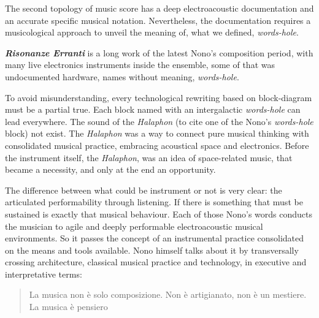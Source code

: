 \documentclass[
	a0,
	portrait
	]{a0poster}
\begin{document}
\begin{multicols}{4}
The second topology of music score has a deep electroacoustic documentation and an accurate specific musical notation. Nevertheless, the documentation requires a musicological approach to unveil the meaning of, what we defined, \emph{words-hole}.

\emph{\textbf{Risonanze Erranti}} is a long work of the latest Nono's composition period, with many live electronics instruments inside the ensemble, some of that was undocumented hardware, names without meaning, \emph{words-hole}. 

To avoid misunderstanding, every technological rewriting based on block-diagram must be a partial true. Each block named with an intergalactic \emph{words-hole} can lead everywhere. The sound of the \emph{Halaphon} (to cite one of the Nono's \emph{words-hole} block) not exist. The \emph{Halaphon} was a way to connect pure musical thinking with consolidated musical practice, embracing acoustical space and electronics. Before the instrument itself, the \emph{Halaphon}, was an idea of space-related music, that became a necessity, and only at the end an opportunity.

The difference between what could be instrument or not is very clear: the articulated performability through listening. If there is something that must be sustained is exactly that musical behaviour. Each of those Nono's words conducts the musician to agile and deeply performable electroacoustic musical environments. So it  passes the concept of an instrumental practice consolidated on the means and tools available. Nono himself talks about it by transversally crossing architecture, classical musical practice and technology, in executive and interpretative terms:

\vfill

\begin{quotation}
\begin{it}
\begin{flushright}
\noindent La musica non è solo composizione. Non è artigianato, non è un mestiere. La musica è pensiero
\end{flushright}
\end{it}
\end{quotation}

\columnbreak



\end{multicols}
\end{document}
